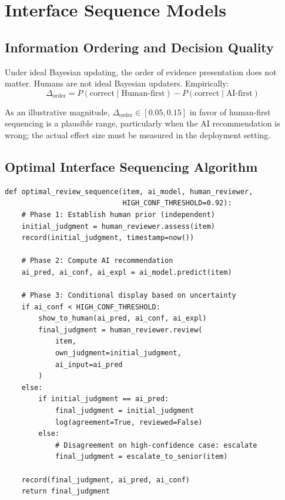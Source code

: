 \section{Interface Sequence Models}

\subsection{Information Ordering and Decision Quality}

Under ideal Bayesian updating, the order of evidence presentation does not matter. Humans are not ideal Bayesian updaters. Empirically:
\[
\Delta_{\text{order}} = P(\text{correct} \mid \text{Human-first}) - P(\text{correct} \mid \text{AI-first})
\]

As an illustrative magnitude, $\Delta_{\text{order}} \in [0.05, 0.15]$ in favor of human-first sequencing is a plausible range, particularly when the AI recommendation is wrong; the actual effect size must be measured in the deployment setting.

\subsection{Optimal Interface Sequencing Algorithm}

\begin{lstlisting}[style=python, caption={Optimal review sequencing for HITL interfaces}]
def optimal_review_sequence(item, ai_model, human_reviewer,
                            HIGH_CONF_THRESHOLD=0.92):
    # Phase 1: Establish human prior (independent)
    initial_judgment = human_reviewer.assess(item)
    record(initial_judgment, timestamp=now())

    # Phase 2: Compute AI recommendation
    ai_pred, ai_conf, ai_expl = ai_model.predict(item)

    # Phase 3: Conditional display based on uncertainty
    if ai_conf < HIGH_CONF_THRESHOLD:
        show_to_human(ai_pred, ai_conf, ai_expl)
        final_judgment = human_reviewer.review(
            item,
            own_judgment=initial_judgment,
            ai_input=ai_pred
        )
    else:
        if initial_judgment == ai_pred:
            final_judgment = initial_judgment
            log(agreement=True, reviewed=False)
        else:
            # Disagreement on high-confidence case: escalate
            final_judgment = escalate_to_senior(item)

    record(final_judgment, ai_pred, ai_conf)
    return final_judgment
\end{lstlisting}

